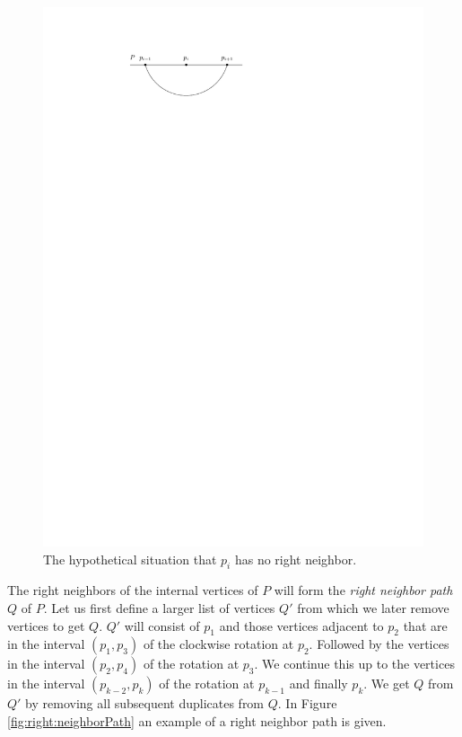     \begin{figure}[b]
      \centering
      \includegraphics[scale=1]{unifiedAlgo/img/rightNeighbourwalk/pHasRightNeighbor.pdf}
      \caption{The hypothetical situation that $p_i$ has no right neighbor.}
      \label{fig:right:pHasRightNeighbor}
    \end{figure}

    The right neighbors of the internal vertices of $P$ will form the \emph{right neighbor path} $Q$ of $P$.
    Let us first define a larger list of vertices $Q'$ from which we later remove vertices to get $Q$. $Q'$ will consist of $p_1$ and those vertices adjacent to $p_{2}$ that are in the interval $(p_1, p_3)$ of the clockwise rotation at $p_2$. Followed by the vertices in the interval $(p_2, p_4)$ of the rotation at $p_{3}$. We continue this up to the vertices in the interval $(p_{k-2}, p_k)$ of the rotation at $p_{k-1}$ and finally $p_k$.
    We get $Q$ from $Q'$ by removing all subsequent duplicates from $Q$.
    In Figure \ref{fig:right:neighborPath} an example of a right neighbor path is given.

